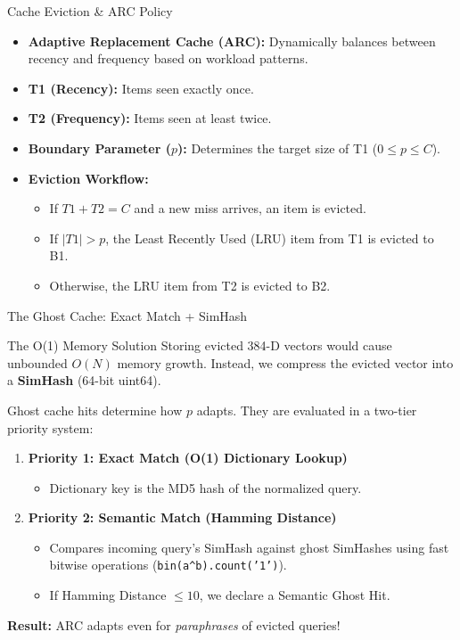 \documentclass[aspectratio=169]{beamer}
\begin{document}
\begin{frame}{Cache Eviction \& ARC Policy}
    \begin{itemize}
        \item \textbf{Adaptive Replacement Cache (ARC):} Dynamically balances between recency and frequency based on workload patterns.
        \item \textbf{T1 (Recency):} Items seen exactly once.
        \item \textbf{T2 (Frequency):} Items seen at least twice.
        \item \textbf{Boundary Parameter ($p$):} Determines the target size of T1 ($0 \le p \le C$).
        \item \textbf{Eviction Workflow:}
        \begin{itemize}
            \item If $T1 + T2 = C$ and a new miss arrives, an item is evicted.
            \item If $|T1| > p$, the Least Recently Used (LRU) item from T1 is evicted to B1.
            \item Otherwise, the LRU item from T2 is evicted to B2.
        \end{itemize}
    \end{itemize}
\end{frame}

\begin{frame}{The Ghost Cache: Exact Match + SimHash}
    \begin{block}{The O(1) Memory Solution}
        Storing evicted 384-D vectors would cause unbounded $O(N)$ memory growth. Instead, we compress the evicted vector into a \textbf{SimHash} (64-bit uint64).
    \end{block}
    
    Ghost cache hits determine how $p$ adapts. They are evaluated in a two-tier priority system:
    \begin{enumerate}
        \item \textbf{Priority 1: Exact Match (O(1) Dictionary Lookup)}
        \begin{itemize}
            \item Dictionary key is the MD5 hash of the normalized query.
        \end{itemize}
        \item \textbf{Priority 2: Semantic Match (Hamming Distance)}
        \begin{itemize}
            \item Compares incoming query's SimHash against ghost SimHashes using fast bitwise operations (\texttt{bin(a\textasciicircum b).count('1')}).
            \item If Hamming Distance $\le 10$, we declare a Semantic Ghost Hit.
        \end{itemize}
    \end{enumerate}
    \textbf{Result:} ARC adapts even for \textit{paraphrases} of evicted queries!
\end{frame}
\end{document}
